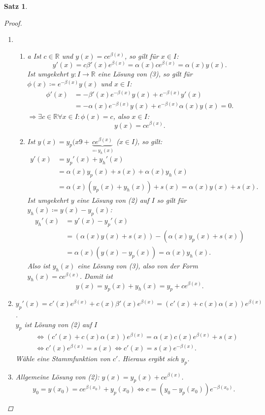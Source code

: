 \documentclass[12pt]{extreport} %
\newcommand{\R}{\mathbb{R}}
\theoremstyle{named}
\theoremstyle{nnamed}
\theoremstyle{itshape}
\newtheorem{satz}[unnamedtheorem]{Satz}
\theoremstyle{normal}
\begin{document}
\begin{satz}
	\begin{proof} ~\
		\begin{enumerate}
			\item \begin{enumerate}
					\item a Ist $c \in \R$ und $y(x) = c e^{\beta(x)}$, so gilt für $x \in I$:
						$$ y'(x) = c \beta'(x) e^{\beta(x)} = \alpha(x) c e^{\beta(x)} = \alpha(x) y(x). $$
						Ist umgekehrt $y \colon I \rightarrow \R$ eine Lösung von (3), so gilt für $\phi(x) \coloneqq e^{-\beta(x)} y(x)$ und $x \in I$:
						\begin{align*}
							\phi'(x) & = - \beta'(x) e^{-\beta(x)} y(x) + e^{-\beta(x)} y'(x) \\
							& = - \alpha(x) e^{-\beta(x)} y(x) + e^{-\beta(x)} \alpha(x) y(x) = 0. 
						\end{align*} 
						$\Rightarrow \exists c \in \R \forall x \in I: \phi(x) = c$, also $x \in I$: 
						$$ y(x) = c e^{\beta(x)}. $$
					\item Ist $y(x) = y_{p}(x9 + \underbrace{c e^{\beta(x)}}_{\eqqcolon y_{h}(x)}$ ($x \in I$), so gilt:
						\begin{align*}
							y'(x) & = y_{p}'(x) + y_{h}'(x) \\
								  & = \alpha(x) y_{p}(x) + s(x) + \alpha(x) y_{h}(x) \\
								  & = \alpha(x) \left( y_{p}(x) + y_{h}(x) \right) + s(x) = \alpha(x) y(x) + s(x). 
						\end{align*} 
						Ist umgekehrt $y$ eine Lösung von (2) auf $I$ so gilt für $y_{h}(x) \coloneqq y(x) - y_{p}(x)$:
						\begin{align*}
							y_{h}'(x) & = y'(x) - y_{p}'(x) \\
								& = \left(\alpha(x) y(x) + s(x) \right) - \left( \alpha(x) y_{p}(x) + s(x) \right) \\
								& = \alpha(x) \left( y(x) - y_{p}(x) \right) = \alpha(x) y_{h}(x). 
						\end{align*} 
						Also ist $y_{h}(x)$ eine Lösung von (3), also von der Form $y_{h}(x) = c e^{\beta(x)}$. Damit ist
						$$ y(x) = y_{p}(x) + y_{h}(x) = y_{p} + c e^{\beta(x)}. $$
				\end{enumerate}
			\item $y_{p}'(x) = c'(x) e^{\beta(x)} + c(x) \beta'(x) e^{\beta(x)} = \left( c'(x) + c(x) \alpha(x) \right) e^{\beta(x)}$. ~\\
				$y_{p}$ ist Lösung von (2) auf $I$
				\begin{align*}
					& \iff \left( c'(x) + c(x) \alpha(x) \right) e^{\beta(x)} = \alpha(x) c(x) e^{\beta(x)} + s(x) \\
					& \iff c'(x) e^{\beta(x)} = s(x) \iff c'(x) = s(x) e^{-\beta(x)}.
				\end{align*} 
				Wähle eine Stammfunktion von $c'$. Hieraus ergibt sich $y_{p}$.
			\item Allgemeine Lösung von (2): $y(x) = y_{p}(x) + c e^{\beta(x)}$.
				$$ y_{0} = y(x_{0}) = c e^{\beta(x_{0})} + y_{p}(x_{0}) \iff c = \left( y_{0} - y_{p}(x_{0}) \right) e^{-\beta(x_{0})}. $$
		\end{enumerate}
	\end{proof}
\end{satz}
	
\end{document}
